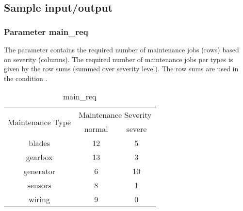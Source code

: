     \subsection{Sample input/output}
        \subsubsection{Parameter main\_req}
        The parameter contains the required number of maintenance jobs (rows) based on severity 
        (columns). The required number of maintenance jobs per types is given by the row sums 
        (summed over severity level). The row sums are used in the condition .
        \begin{table}[H]
            \begin{center}
                \begin{tabular}{ |c|c|c| } 
                \hline
                \multirow{2}{*}{Maintenance Type} &
                \multicolumn{2}{|c|}{Maintenance Severity}\\
                \cline{2-2}\cline{3-3}
                & normal & severe \\ 
                \hline
                blades    & 12 & 5  \\ 
                gearbox   & 13 & 3  \\ 
                generator & 6  & 10 \\ 
                sensors   & 8  & 1  \\ 
                wiring    & 9  & 0  \\ 
                \hline
                \end{tabular}
            \end{center}
        \caption{main\_req} %
        \label{param_main_req} %
        \end{table}

